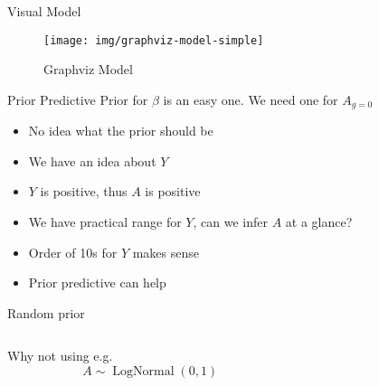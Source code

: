 \documentclass{beamer}
\begin{document}
\begin{frame}{Visual Model}
    \begin{figure}
        \centering
        \texttt{[image: img/graphviz-model-simple]}
        \caption{Graphviz Model}
    \end{figure}
\end{frame}
\begin{frame}{Prior Predictive}
    Prior for $\beta$ is an easy one. We need one for $A_{g=0}$
    \begin{itemize}
        \item<2-> No idea what the prior should be
        \item<3-> We have an idea about $Y$
        \item<4-> $Y$ is positive, thus $A$ is positive
        \item<5-> We have practical range for $Y$, can we infer $A$ at a glance?
        \item<6-> Order of 10s for $Y$ makes sense
        \item<7-> Prior predictive can help
    \end{itemize}
\end{frame}
\begin{frame}{Random prior}
\begin{columns}
\begin{column}{0.5\linewidth}
Why not using e.g.
\begin{equation*}
    A \sim \operatorname{LogNormal}(0, 1)
\end{equation*}
\end{column}
\begin{column}{0.5\linewidth}
\end{column}
\end{columns}
\end{frame}
\end{document}
